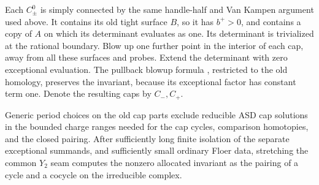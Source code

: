 Each $C_\pm^0$ is simply connected by the same handle-half and Van Kampen
argument used above.  It contains its old tight surface $B$, so it has
$b^+>0$, and contains a copy of $A$ on which its determinant evaluates
as one.  Its determinant is trivialized at the rational boundary.
Blow up one further point in the interior of each cap, away from all
these surfaces and probes.  Extend the determinant with zero exceptional
evaluation.  The pullback blowup formula
\cite[Proposition~1.9]{KronheimerMrowka1995}, restricted to the old homology,
preserves the invariant, because its exceptional factor has constant
term one.  Denote the resulting caps by $C_-,C_+$.

\begin{proposition}\label{prop:caps:periods}
Generic period choices on the old cap parts exclude reducible ASD cap
solutions in the bounded charge ranges needed for the cap cycles,
comparison homotopies, and the closed pairing.  After sufficiently long
finite isolation of the separate exceptional summands, and sufficiently
small ordinary Floer data, stretching the common $Y_2$ seam computes
the nonzero allocated invariant as the pairing of a cycle and a cocycle
on the irreducible complex.
\end{proposition}

